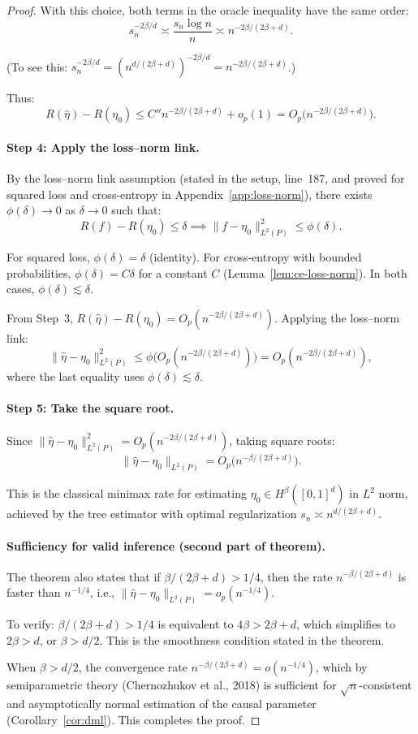\documentclass[12pt]{article}
\begin{document}
\begin{proof}
With this choice, both terms in the oracle inequality have the same order:
\[
s_n^{-2\beta/d} \asymp \frac{s_n \log n}{n} \asymp n^{-2\beta/(2\beta+d)}.
\]

(To see this: $s_n^{-2\beta/d} = (n^{d/(2\beta+d)})^{-2\beta/d} = n^{-2\beta/(2\beta+d)}$.)

Thus:
\[
R(\hat\eta) - R(\eta_0) \le C'' n^{-2\beta/(2\beta+d)} + o_p(1) = O_p\bigl( n^{-2\beta/(2\beta+d)} \bigr).
\]

\paragraph{Step 4: Apply the loss--norm link.}
By the loss--norm link assumption (stated in the setup, line~187, and proved for squared loss and cross-entropy in Appendix~\ref{app:loss-norm}), there exists $\phi(\delta) \to 0$ as $\delta \to 0$ such that:
\[
R(f) - R(\eta_0) \le \delta \implies \|f - \eta_0\|_{L^2(P)}^2 \le \phi(\delta).
\]

For squared loss, $\phi(\delta) = \delta$ (identity). For cross-entropy with bounded probabilities, $\phi(\delta) = C\delta$ for a constant $C$ (Lemma~\ref{lem:ce-loss-norm}). In both cases, $\phi(\delta) \lesssim \delta$.

From Step~3, $R(\hat\eta) - R(\eta_0) = O_p(n^{-2\beta/(2\beta+d)})$. Applying the loss--norm link:
\[
\|\hat\eta - \eta_0\|_{L^2(P)}^2 \le \phi\bigl( O_p(n^{-2\beta/(2\beta+d)}) \bigr) = O_p(n^{-2\beta/(2\beta+d)}),
\]
where the last equality uses $\phi(\delta) \lesssim \delta$.

\paragraph{Step 5: Take the square root.}
Since $\|\hat\eta - \eta_0\|_{L^2(P)}^2 = O_p(n^{-2\beta/(2\beta+d)})$, taking square roots:
\[
\|\hat\eta - \eta_0\|_{L^2(P)} = O_p\bigl( n^{-\beta/(2\beta+d)} \bigr).
\]

This is the classical minimax rate for estimating $\eta_0 \in H^\beta([0,1]^d)$ in $L^2$ norm, achieved by the tree estimator with optimal regularization $s_n \asymp n^{d/(2\beta+d)}$.

\paragraph{Sufficiency for valid inference (second part of theorem).}
The theorem also states that if $\beta/(2\beta+d) > 1/4$, then the rate $n^{-\beta/(2\beta+d)}$ is faster than $n^{-1/4}$, i.e., $\|\hat\eta - \eta_0\|_{L^2(P)} = o_p(n^{-1/4})$.

To verify: $\beta/(2\beta+d) > 1/4$ is equivalent to $4\beta > 2\beta + d$, which simplifies to $2\beta > d$, or $\beta > d/2$. This is the smoothness condition stated in the theorem.

When $\beta > d/2$, the convergence rate $n^{-\beta/(2\beta+d)} = o(n^{-1/4})$, which by semiparametric theory (Chernozhukov et al., 2018) is sufficient for $\sqrt{n}$-consistent and asymptotically normal estimation of the causal parameter (Corollary~\ref{cor:dml}). This completes the proof.
\end{proof}
\end{document}
